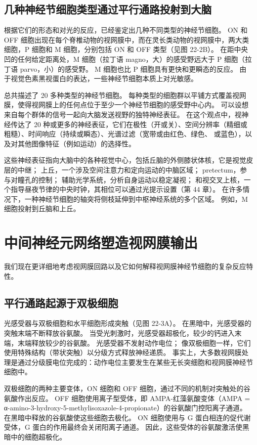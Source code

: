 \subsection{几种神经节细胞类型通过平行通路投射到大脑}
根据它们的形态和对光的反应，已经鉴定出几种不同类型的神经节细胞。 ON 和 OFF 细胞出现在每个脊椎动物的视网膜中，而在灵长类动物的视网膜中，两大类细胞，P 细胞和 M 细胞，分别包括 ON 和 OFF 类型（见图 22-2B）。 在距中央凹的任何给定距离处，M 细胞（拉丁语 magno，大）的感受野远大于 P 细胞（拉丁语 parvo，小）的感受野。 M 细胞也比 P 细胞具有更快和更瞬态的反应。 由于视觉色素黑视蛋白的表达，一些神经节细胞本质上对光敏感。

总共描述了 20 多种类型的神经节细胞。 每种类型的细胞群以平铺方式覆盖视网膜，使得视网膜上的任何点位于至少一个神经节细胞的感受野中心内。 可以设想来自每个群体的信号一起向大脑发送视野的独特神经表征。 在这个观点中，视神经传达了 20 种或更多的神经表征，它们在极性（开或关）、空间分辨率（精细或粗糙）、时间响应（持续或瞬态）、光谱过滤（宽带或由红色、绿色、 或蓝色），以及对其他图像特征（例如运动）的选择性。

这些神经表征指向大脑中的各种视觉中心，包括丘脑的外侧膝状体核，它是视觉皮层的中继； 上丘，一个涉及空间注意力和定向运动的中脑区域； pretectum，参与对瞳孔的控制； 辅助光学系统，分析自身运动以稳定凝视； 和视交叉上核，一个指导昼夜节律的中央时钟，其相位可以通过光提示设置（第 44 章）。 在许多情况下，一种神经节细胞的轴突将侧枝延伸到中枢神经系统的多个区域。 例如，M 细胞投射到丘脑和上丘。


\section{中间神经元网络塑造视网膜输出}
我们现在更详细地考虑视网膜回路以及它如何解释视网膜神经节细胞的复杂反应特性。

\subsection{平行通路起源于双极细胞}
光感受器与双极细胞和水平细胞形成突触（见图 22-3A）。 在黑暗中，光感受器的突触末端不断释放谷氨酸。 当受光刺激时，光感受器超极化，较少的钙进入末端，末端释放较少的谷氨酸。 光感受器不发射动作电位； 像双极细胞一样，它们使用特殊结构（带状突触）以分级方式释放神经递质。 事实上，大多数视网膜处理是通过分级膜电位完成的：动作电位主要发生在某些无长突细胞和视网膜神经节细胞中。

双极细胞的两种主要变体，ON 细胞和 OFF 细胞，通过不同的机制对突触处的谷氨酸作出反应。 OFF 细胞使用离子型受体，即 AMPA-红藻氨酸变体（AMPA = α-amino-3-hydroxy-5-methylisoxazole-4-propionate）的谷氨酸门控阳离子通道。 在黑暗中释放的谷氨酸使这些细胞去极化。 ON 细胞使用与 G 蛋白相连的促代谢受体，G 蛋白的作用最终会关闭阳离子通道。 因此，这些受体的谷氨酸激活使黑暗中的细胞超极化。

